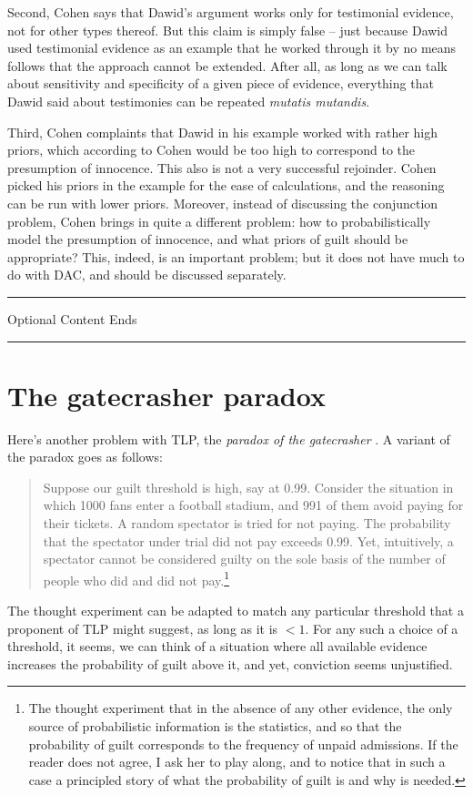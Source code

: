 \documentclass{ifcolog}
\newcommand{\intermezzob}{\nopagebreak 
	\begin{minipage}[c]{13cm}
	\begin{center}\rule{10cm}{0.4pt}

	\tiny{\sc Optional Content Ends}
	
	\vspace{-1mm}
	
	\rule{10cm}{0.4pt}\end{center}
	\end{minipage}
	}
\begin{document}
Second, Cohen says that Dawid's argument works only for testimonial evidence, not for other types thereof. But this claim is simply false -- just because Dawid used testimonial evidence as an example that he worked through it by no means follows that the approach cannot be extended. After all, as long as we can talk about sensitivity and specificity of a given piece of evidence, everything that Dawid said about testimonies can be repeated \emph{mutatis mutandis}.



Third, Cohen complaints that Dawid in his example worked with rather high priors, which according to Cohen would be too high to correspond to the presumption of innocence. This also is not a very successful rejoinder. Cohen picked his priors in the example for the ease of calculations, and the reasoning can be run with lower priors. Moreover, instead of discussing the conjunction problem, Cohen brings in quite a different problem: how to probabilistically model the presumption of innocence, and what priors of guilt should be appropriate? This, indeed, is an important problem; but it does not have much to do with DAC, and should be discussed separately.


\intermezzob 


\section{The gatecrasher paradox}\label{sec:gatecrasher}

Here's another problem with TLP, the \emph{paradox of the gatecrasher} \citep{Cohen1977The-probable-an, Nesson1979Reasonable-doub}. A variant of the paradox goes as follows: 
\begin{quote}
Suppose our guilt threshold is high, say at 0.99. Consider the situation in which 1000 fans enter a football stadium, and 991 of them avoid paying for their tickets. A random spectator is tried for not paying. The  probability that the spectator under trial did not pay exceeds 0.99.   Yet, intuitively, a spectator cannot be considered guilty on the sole basis of the number of people who did and did not pay.\footnote{The thought experiment that in the absence of any other evidence, the only source of probabilistic information is the statistics, and so that the probability of guilt corresponds to the frequency of unpaid admissions. If the reader does not agree, I ask her to play along, and to notice that in such a case a principled story of what the probability of guilt is and why is needed.}
\end{quote}
\noindent  The thought experiment can be adapted to match any particular threshold that a proponent of TLP might suggest, as long as it is $<1$. For any such a choice of a threshold, it seems, we can think of a situation where all available evidence increases the probability of guilt above it, and yet, conviction seems unjustified.
\end{document}
